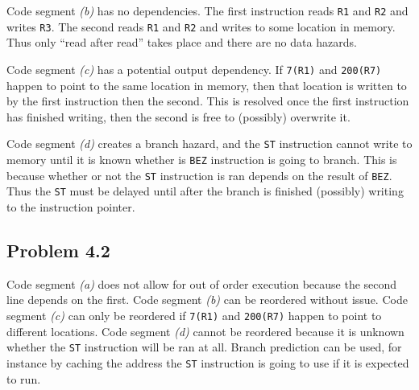 \documentclass[12pt,letterpaper]{article}
\begin{document}
Code segment \textit{(b)} has no dependencies. The first instruction reads \lstinline{R1} and
\lstinline{R2} and writes \lstinline{R3}. The
second reads \lstinline{R1} and \lstinline{R2} and writes to some location in memory. Thus only ``read after read'' takes
place and there are no data hazards.

Code segment \textit{(c)} has a potential output dependency. If \lstinline{7(R1)} and
\lstinline{200(R7)} happen to point to the same
location in memory, then that location is written to by the first instruction then the second. This
is resolved once the first instruction has finished writing, then the second is free to (possibly)
overwrite it.

Code segment \textit{(d)} creates a branch hazard, and the \lstinline{ST} instruction cannot write to memory until it is
known whether is \lstinline{BEZ} instruction is going to branch. This is because whether or not the
\lstinline{ST}
instruction is ran depends on the result of \lstinline{BEZ}. Thus the \lstinline{ST} must be delayed until after the
branch is finished (possibly) writing to the instruction pointer.

\subsection*{Problem 4.2}

Code segment \textit{(a)} does not allow for out of order execution because the second line depends on the
first. Code segment \textit{(b)} can be reordered without issue. Code segment \textit{(c)} can only be reordered if
\lstinline{7(R1)} and \lstinline{200(R7)} happen to point to different locations. Code segment \textit{(d)} cannot be reordered
because it is unknown whether the \lstinline{ST} instruction will be ran at all. Branch prediction can be used,
for instance by caching the address the \lstinline{ST} instruction is going to use if it is expected to run.
\end{document}
